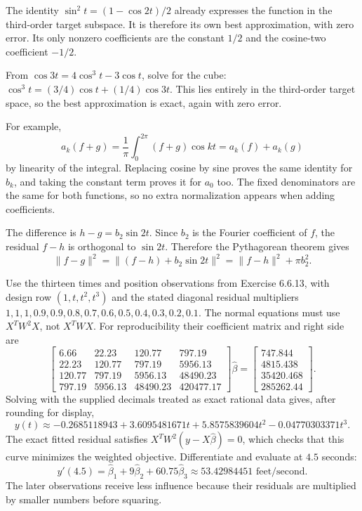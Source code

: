 The identity $\sin^2t=(1-\cos2t)/2$ already expresses the function
in the third-order target subspace. It is therefore its own best
approximation, with zero error. Its only nonzero coefficients are
the constant $1/2$ and the cosine-two coefficient $-1/2$.

From $\cos3t=4\cos^3t-3\cos t$, solve for the cube:
$\cos^3t=(3/4)\cos t+(1/4)\cos3t$.
This lies entirely in the third-order target space, so the best
approximation is exact, again with zero error.

For example,
\[
 a_k(f+g)=\frac1\pi\int_0^{2\pi}(f+g)\cos kt
 =a_k(f)+a_k(g)
\]
by linearity of the integral. Replacing cosine by sine proves the
same identity for $b_k$, and taking the constant term proves it
for $a_0$ too. The fixed denominators are the same for both functions,
so no extra normalization appears when adding coefficients.

The difference is $h-g=b_2\sin2t$. Since $b_2$ is the Fourier
coefficient of $f$, the residual $f-h$ is orthogonal to $\sin2t$.
Therefore the Pythagorean theorem gives
\[
 \|f-g\|^2=\|(f-h)+b_2\sin2t\|^2
 =\|f-h\|^2+\pi b_2^2.
\]

Use the thirteen times and position observations from Exercise 6.6.13,
with design row $(1,t,t^2,t^3)$ and the stated diagonal residual
multipliers $1,1,1,0.9,0.9,0.8,0.7,0.6,0.5,0.4,0.3,0.2,0.1$.
The normal equations must use $X^TW^2X$, not $X^TWX$.
For reproducibility their coefficient matrix and right side are
\[
 \begin{bmatrix}
6.66&22.23&120.77&797.19\\
22.23&120.77&797.19&5956.13\\
120.77&797.19&5956.13&48490.23\\
797.19&5956.13&48490.23&420477.17
\end{bmatrix}\widehat\beta
 =\begin{bmatrix}747.844\\4815.438\\35420.468\\285262.44\end{bmatrix}.
\]
Solving with the supplied decimals treated as exact rational data gives,
after rounding for display,
\[
 y(t)\approx-0.2685118943+3.6095481671t
 +5.8575839604t^2-0.04770303371t^3.
\]
The exact fitted residual satisfies $X^TW^2(y-X\widehat\beta)=0$,
which checks that this curve minimizes the weighted objective.
Differentiate and evaluate at $4.5$ seconds:
\[
 y'(4.5)=\widehat\beta_1+9\widehat\beta_2+60.75\widehat\beta_3
 \approx\boxed{53.42984451\text{ feet/second}}.
\]
The later observations receive less influence because their residuals
are multiplied by smaller numbers before squaring.


